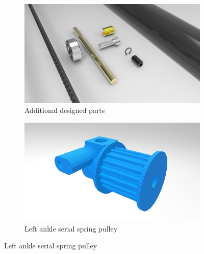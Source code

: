 \begin{figure}[ht!]
    \begin{subfigure}[b]{0.49\textwidth}
        \includegraphics[width=\textwidth]{figures/legs_parts.jpg}
        \caption{Additional designed parts}
        \label{fig:mouse}
    \end{subfigure}
    \begin{subfigure}[b]{0.49\textwidth}
        \includegraphics[width=\textwidth]{figures/legs_pulley.jpg}
        \caption{Left ankle serial spring pulley}
        \label{fig:serial_spring_pulley}
    \end{subfigure}


\end{figure}
